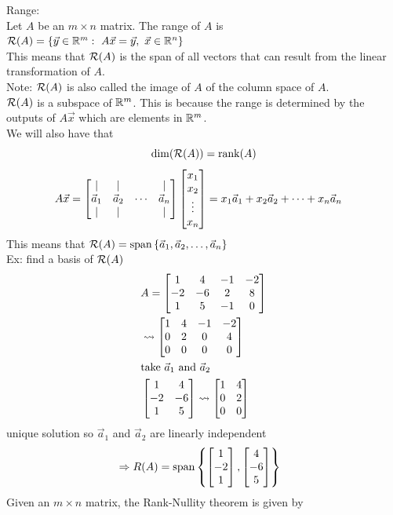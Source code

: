 \documentclass[11pt, fleqn]{article}
\begin{document}
Range:\\
Let $A$ be an $m\times n$ matrix. The range of $A$ is $\Range(A)=\brcurly{\vec{y}\in\R^m:\ A\vec{x}=\vec{y},\ \vec{x}\in\R^n}$\\
This means that $\mathcal{R}(A)$ is the span of all vectors that can result from the linear transformation of $A$.\\
Note: $\mathcal{R}(A)$ is also called the image of $A$ of the column space of $A$.\\
$\mathcal{R}(A)$ is a subspace of $\mathbb{R}^m$. This is because the range is determined by the outputs of $A\vec{x}$ which are elements in $\mathbb{R}^m$.\\
We will also have that
$$\dim(\mathcal{R}(A))=\operatorname{rank}(A)$$
\begin{align*}
    &A\vec{x}=\matrixx{| & | & & |\\ \vec{a}_1 & \vec{a}_2 & \cdots & \vec{a}_n\\ | & | & & |}\matrixx{x_1\\x_2\\\vdots\\ x_n}=x_1\vec{a}_1+x_2\vec{a}_2+\cdots+x_n\vec{a}_n
\end{align*}
This means that $\mathcal{R}(A)=\operatorname{span}\left\{ \vec{a}_1,\vec{a}_2,\ldots,\vec{a}_n \right\}$\\
Ex: find a basis of $\mathcal{R}(A)$
\begin{align*}
    &A=\matrixx{1 & 4 & -1 & -2\\ -2 & -6 & 2 & 8\\ 1 & 5 &-1 & 0}\\
    &\leadsto \matrixx{1 & 4 & -1 & -2\\ 0 & 2 & 0 & 4\\ 0 & 0 & 0 & 0}\\
    &\text{take }\vec{a}_1\text{ and }\vec{a}_2\\
    &\matrixx{1 & 4\\ -2 & -6\\ 1 & 5}\leadsto\matrixx{1 & 4\\ 0 & 2\\ 0 & 0}
\end{align*}
unique solution so $\vec{a}_1$ and $\vec{a}_2$ are linearly independent
\begin{align*}
    &\Ra R(A)=\spann\brcurly{\matrixx{1\\-2\\1},\matrixx{4\\-6\\5}}
\end{align*}
Given an $m\times n$ matrix, the Rank-Nullity theorem is given by
\end{document}
